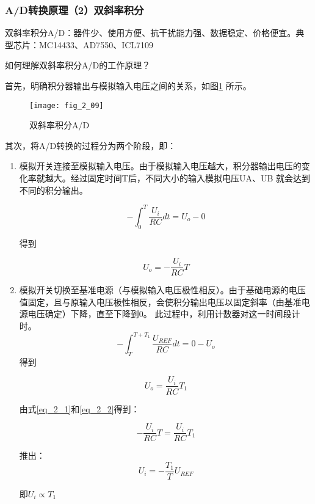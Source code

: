 \subsubsection{A/D转换原理（2）双斜率积分}

双斜率积分A/D：器件少、使用方便、抗干扰能力强、数据稳定、价格便宜。典型芯片：MC14433、AD7550、ICL7109\newline

如何理解双斜率积分A/D的工作原理？


首先，明确积分器输出与模拟输入电压之间的关系，如图\ref{fig_2_09} 所示。


\begin{figure}[h]
  \centering
  \texttt{[image: fig\_2\_09]}\\
  \caption{双斜率积分A/D}\label{fig_2_09}
\end{figure}

  其次，将A/D转换的过程分为两个阶段，即：
  \begin{enumerate}
    \item 模拟开关连接至模拟输入电压。由于模拟输入电压越大，积分器输出电压的变化率就越大。经过固定时间T后，不同大小的输入模拟电压UA、UB 就会达到不同的积分输出。

    \begin{equation}
    -\int_0^T\frac{U_i}{RC}dt=U_o-0
  \end{equation}

  得到


\begin{equation}\label{eq_2_1}
  U_o=-\frac{U_i}{RC}T
  \end{equation}

    \item 模拟开关切换至基准电源（与模拟输入电压极性相反）。由于基础电源的电压值固定，且与原输入电压极性相反，会使积分输出电压以固定斜率（由基准电源电压确定）下降，直至下降到0。 此过程中，利用计数器对这一时间段计时。
              \begin{equation}
    -\int_T^{T+T_1}\frac{U_{REF}}{RC}dt=0-U_o
  \end{equation}
      得到

   \begin{equation}\label{eq_2_2}
  U_o=\frac{U_i}{RC}T_1
  \end{equation}

      由式\ref{eq_2_1}和\ref{eq_2_2}得到：

  \begin{equation}
   -\frac{U_i}{RC}T=\frac{U_i}{RC}T_1
  \end{equation}

  推出：
    \begin{equation}
   {U_i}=-\frac{T_1}{T}U_{REF}
  \end{equation}

  即$U_i\propto T_1$



  \end{enumerate}

